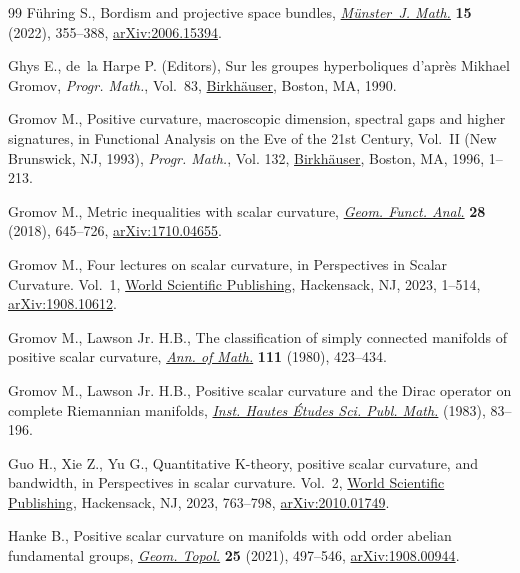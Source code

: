 \documentclass[pdftex]{sigma}
\numberwithin{equation}{section}
\begin{document}
\begin{thebibliography}{99}
F\"uhring S., Bordism and projective space bundles, \href{https://doi.org/10.17879/21089690084}{\textit{M\"unster~J. Math.}}
 \textbf{15} (2022), 355--388, \href{https://arxiv.org/abs/2006.15394}{arXiv:2006.15394}.

Ghys E., de~la Harpe P. (Editors), Sur les groupes hyperboliques d'apr\`es
 {M}ikhael {G}romov, \textit{Progr. Math.}, Vol.~83, \href{https://doi.org/10.1007/978-1-4684-9167-8}{Birkh\"auser}, Boston, MA,
 1990.

Gromov M., Positive curvature, macroscopic dimension, spectral gaps and higher
 signatures, in Functional {A}nalysis on the {E}ve of the 21st {C}entury,
 {V}ol.~{II} ({N}ew {B}runswick, {NJ}, 1993), \textit{Progr. Math.}, Vol. 132,
  \href{https://doi.org/10.1007/978-1-4612-4098-3_1}{Birkh\"auser}, Boston, MA, 1996, 1--213.

Gromov M., Metric inequalities with scalar curvature, \href{https://doi.org/10.1007/s00039-018-0453-z}{\textit{Geom. Funct.
 Anal.}} \textbf{28} (2018), 645--726, \href{https://arxiv.org/abs/1710.04655}{arXiv:1710.04655}.

Gromov M., Four lectures on scalar curvature, in Perspectives in {S}calar
 {C}urvature. {V}ol.~1, \href{https://doi.org/10.1142/97898112732230001}{World Scientific Publishing}, Hackensack, NJ, 2023,
 1--514, \href{https://arxiv.org/abs/1908.10612}{arXiv:1908.10612}.

Gromov M., Lawson Jr. H.B., The classification of simply connected manifolds of
 positive scalar curvature, \href{https://doi.org/10.2307/1971103}{\textit{Ann. of Math.}} \textbf{111} (1980),
 423--434.

Gromov M., Lawson Jr. H.B., Positive scalar curvature and the {D}irac operator
 on complete {R}iemannian manifolds, \href{https://doi.org/10.1007/BF02953774}{\textit{Inst. Hautes \'Etudes Sci. Publ.
 Math.}} (1983), 83--196.

Guo H., Xie Z., Yu G., Quantitative {K}-theory, positive scalar curvature, and
 bandwidth, in Perspectives in scalar curvature. {V}ol.~2, \href{https://doi.org/10.1142/12644-vol2}{World Scientific
 Publishing}, Hackensack, NJ, 2023, 763--798, \href{https://arxiv.org/abs/2010.01749}{arXiv:2010.01749}.

Hanke B., Positive scalar curvature on manifolds with odd order abelian
 fundamental groups, \href{https://doi.org/10.2140/gt.2021.25.497}{\textit{Geom. Topol.}} \textbf{25} (2021), 497--546,
 \href{https://arxiv.org/abs/1908.00944}{arXiv:1908.00944}.


\end{thebibliography}
\end{document}
